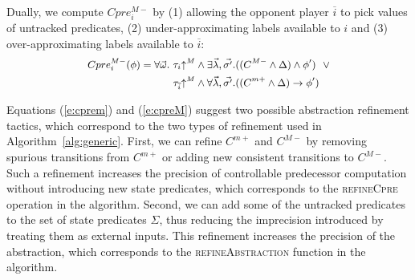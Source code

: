 Dually, we compute $Cpre_i^{M-}$ by (1) allowing the opponent 
player $\overline{i}$ to pick values of untracked predicates, (2) 
under-approximating labels available to $i$ and (3) 
over-approximating labels available to $\overline{i}$:
\begin{equation}
    \small
    \label{e:cpreM}
\begin{aligned}
    Cpre_i^{M-}(\phi) = \forall \vec{\omega}.~&\tau_i\mathord{\uparrow^M}         \land \exists \vec{\lambda},\vec{\sigma'}. ((C^{M-} \land \Delta) \land \phi')
                                             ~~\lor\\
                                               &\tau_{\overline{i}}\mathord{\uparrow^M} \land \forall \vec{\lambda},\vec{\sigma'}. ((C^{m+} \land \Delta) \rightarrow \phi')
\end{aligned}
\end{equation}

Equations (\ref{e:cprem}) and (\ref{e:cpreM}) suggest two possible 
abstraction refinement tactics, which correspond to the two types 
of refinement used in Algorithm~\ref{alg:generic}.  First, we can 
refine $C^{m+}$ and $C^{M-}$ by removing spurious transitions from 
$C^{m+}$ or adding new consistent transitions to $C^{M-}$.  Such a 
refinement increases the precision of controllable predecessor 
computation without introducing new state predicates, which 
corresponds to the \textsc{refineCpre} operation in the algorithm.  
Second, we can add some of the untracked predicates to the set of 
state predicates $\Sigma$, thus reducing the imprecision 
introduced by treating them as external inputs.  This refinement 
increases the precision of the abstraction, which corresponds to 
the \textsc{refineAbstraction} function in the algorithm.

